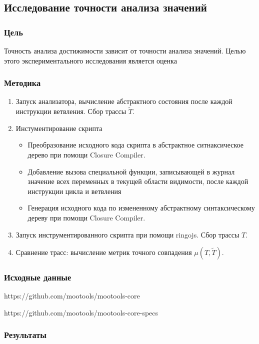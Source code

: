 \subsection{Исследование точности анализа значений}
\subsubsection{Цель}
Точность анализа достижимости зависит от точности анализа значений.
Целью этого экспериментального исследования является оценка 
\subsubsection{Методика}
\begin{enumerate}
  \item Запуск анализатора, вычисление абстрактного состояния после
    каждой инструкции ветвления. Сбор трассы $\tilde{T}$.
  \item Инстументирование скрипта
    \begin{itemize}
      \item Преобразование исходного кода скрипта в абстрактное
	ситнаксическое дерево при помощи Closure Compiler.
      \item Добавление вызова специальной функции, записывающей в
	журнал значение всех переменных в текущей области видимости,
	после каждой инструкции цикла и ветвления
      \item Генерация исходного кода по измененному абстрактному
	синтаксическому дереву при помощи Closure Compiler.
    \end{itemize}
  \item Запуск инструментированного скрипта при помощи ringojs. Сбор
    трассы $T$.
  \item Сравнение трасс: вычисление метрик точного совпадения
    $\mu\left( T, \tilde{T} \right)$.
\end{enumerate}
\subsubsection{Исходные данные}
https://github.com/mootools/mootools-core

https://github.com/mootools/mootools-core-specs
\subsubsection{Результаты}

